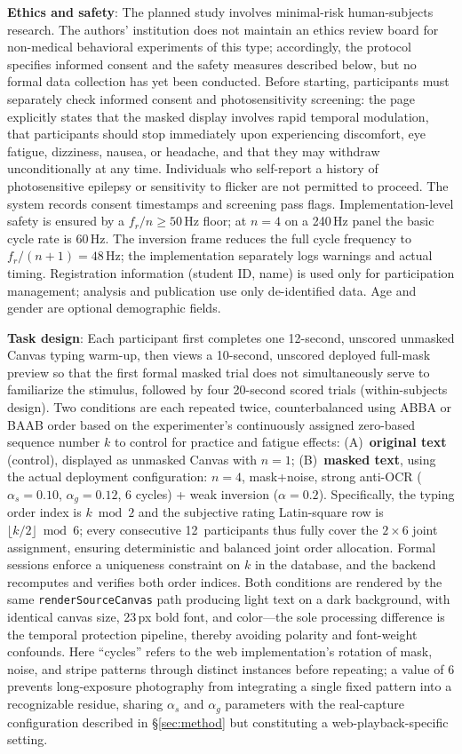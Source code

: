 \documentclass{ieeeaccess}
\begin{document}
\textbf{Ethics and safety}: The planned study involves minimal-risk human-subjects research. The authors' institution does not maintain an ethics review board for non-medical behavioral experiments of this type; accordingly, the protocol specifies informed consent and the safety measures described below, but no formal data collection has yet been conducted. Before starting, participants must separately check informed consent and photosensitivity screening: the page explicitly states that the masked display involves rapid temporal modulation, that participants should stop immediately upon experiencing discomfort, eye fatigue, dizziness, nausea, or headache, and that they may withdraw unconditionally at any time. Individuals who self-report a history of photosensitive epilepsy or sensitivity to flicker are not permitted to proceed. The system records consent timestamps and screening pass flags. Implementation-level safety is ensured by a $f_r/n\geq50$\,Hz floor; at $n=4$ on a 240\,Hz panel the basic cycle rate is 60\,Hz. The inversion frame reduces the full cycle frequency to $f_r/(n+1)=48$\,Hz; the implementation separately logs warnings and actual timing. Registration information (student ID, name) is used only for participation management; analysis and publication use only de-identified data. Age and gender are optional demographic fields.

\textbf{Task design}: Each participant first completes one 12-second, unscored unmasked Canvas typing warm-up, then views a 10-second, unscored deployed full-mask preview so that the first formal masked trial does not simultaneously serve to familiarize the stimulus, followed by four 20-second scored trials (within-subjects design). Two conditions are each repeated twice, counterbalanced using ABBA or BAAB order based on the experimenter's continuously assigned zero-based sequence number $k$ to control for practice and fatigue effects: (A)~\textbf{original text} (control), displayed as unmasked Canvas with $n=1$; (B)~\textbf{masked text}, using the actual deployment configuration: $n=4$, mask+noise, strong anti-OCR ($\alpha_s=0.10$, $\alpha_g=0.12$, 6 cycles) + weak inversion ($\alpha=0.2$). Specifically, the typing order index is $k\bmod2$ and the subjective rating Latin-square row is $\lfloor k/2\rfloor\bmod6$; every consecutive 12~participants thus fully cover the $2\times6$ joint assignment, ensuring deterministic and balanced joint order allocation. Formal sessions enforce a uniqueness constraint on $k$ in the database, and the backend recomputes and verifies both order indices. Both conditions are rendered by the same \texttt{renderSourceCanvas} path producing light text on a dark background, with identical canvas size, 23\,px bold font, and color---the sole processing difference is the temporal protection pipeline, thereby avoiding polarity and font-weight confounds. Here ``cycles'' refers to the web implementation's rotation of mask, noise, and stripe patterns through distinct instances before repeating; a value of 6 prevents long-exposure photography from integrating a single fixed pattern into a recognizable residue, sharing $\alpha_s$ and $\alpha_g$ parameters with the real-capture configuration described in \S\ref{sec:method} but constituting a web-playback-specific setting.
\end{document}
